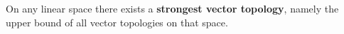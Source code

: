 On any linear space there exists a \textbf{strongest vector topology}, namely the upper bound of all vector topologies on that space.
